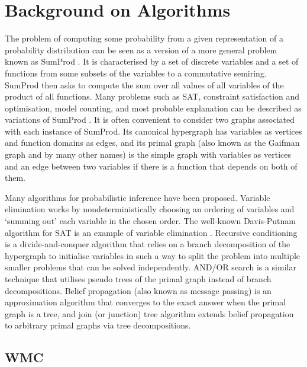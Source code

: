 \documentclass{article}
\begin{document}
{\section{Background on Algorithms} \label{sec:background}

The problem of computing some probability from a given representation of a
probability distribution can be seen as a version of a more general problem
known as SumProd
\cite{DBLP:journals/jair/BacchusDP09,DBLP:journals/ai/Dechter99}. It is
characterised by a set of discrete variables and a set of functions from some
subsets of the variables to a commutative semiring. SumProd then asks to compute
the sum over all values of all variables of the product of all functions. Many
problems such as SAT, constraint satisfaction and optimisation, model counting,
and most probable explanation can be described as variations of SumProd
\cite{DBLP:journals/jair/BacchusDP09,DBLP:journals/ai/Dechter99}. It is often
convenient to consider two graphs associated with each instance of SumProd. Its
canonical hypergraph has variables as vertices and function domains as edges,
and its primal graph (also known as the Gaifman graph and by many other names)
is the simple graph with variables as vertices and an edge between two variables
if there is a function that depends on both of them.

Many algorithms for probabilistic inference have been proposed. Variable
elimination \cite{DBLP:journals/ai/Dechter99} works by nondeterministically
choosing an ordering of variables and `summing out' each variable in the chosen
order. The well-known Davis-Putnam algorithm \cite{DBLP:journals/jacm/DavisP60}
for SAT is an example of variable elimination
\cite{DBLP:journals/jair/BacchusDP09}. Recursive conditioning
\cite{DBLP:journals/ai/Darwiche01} is a divide-and-conquer algorithm that relies
on a branch decomposition of the hypergraph to initialise variables in such a
way to split the problem into multiple smaller problems that can be solved
independently. AND/OR search
\cite{DBLP:journals/ai/DechterM07,nilsson1980principles} is a similar technique
that utilises pseudo trees of the primal graph instead of branch decompositions.
Belief propagation (also known as message passing) \cite{DBLP:conf/aaai/Pearl82}
is an approximation algorithm that converges to the exact answer when the primal
graph is a tree, and join (or junction) tree algorithm \cite{lauritzen1988local}
extends belief propagation to arbitrary primal graphs via tree decompositions.

\subsection{WMC}

}
\end{document}
